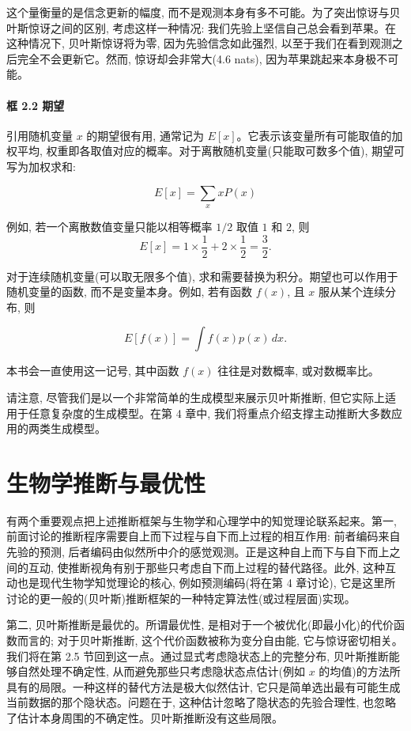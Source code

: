 这个量衡量的是信念更新的幅度, 而不是观测本身有多不可能。为了突出惊讶与贝叶斯惊讶之间的区别, 考虑这样一种情况: 我们先验上坚信自己总会看到苹果。在这种情况下, 贝叶斯惊讶将为零, 因为先验信念如此强烈, 以至于我们在看到观测之后完全不会更新它。然而, 惊讶却会非常大(4.6 nats), 因为苹果跳起来本身极不可能。

\paragraph{框 2.2 期望}

引用随机变量 $x$ 的期望很有用, 通常记为 $E[x]$。它表示该变量所有可能取值的加权平均, 权重即各取值对应的概率。对于离散随机变量(只能取可数多个值), 期望可写为加权求和:

\[
E[x] = \sum_x xP(x)
\]

例如, 若一个离散数值变量只能以相等概率 $1/2$ 取值 $1$ 和 $2$, 则
\[
E[x] = 1 \times \frac{1}{2} + 2 \times \frac{1}{2} = \frac{3}{2}.
\]

对于连续随机变量(可以取无限多个值), 求和需要替换为积分。期望也可以作用于随机变量的函数, 而不是变量本身。例如, 若有函数 $f(x)$, 且 $x$ 服从某个连续分布, 则

\[
E[f(x)] = \int f(x)p(x)\,dx.
\]

本书会一直使用这一记号, 其中函数 $f(x)$ 往往是对数概率, 或对数概率比。

请注意, 尽管我们是以一个非常简单的生成模型来展示贝叶斯推断, 但它实际上适用于任意复杂度的生成模型。在第 4 章中, 我们将重点介绍支撑主动推断大多数应用的两类生成模型。

\section{生物学推断与最优性}

有两个重要观点把上述推断框架与生物学和心理学中的知觉理论联系起来。第一, 前面讨论的推断程序需要自上而下过程与自下而上过程的相互作用: 前者编码来自先验的预测, 后者编码由似然所中介的感觉观测。正是这种自上而下与自下而上之间的互动, 使推断视角有别于那些只考虑自下而上过程的替代路径。此外, 这种互动也是现代生物学知觉理论的核心, 例如预测编码(将在第 4 章讨论), 它是这里所讨论的更一般的(贝叶斯)推断框架的一种特定算法性(或过程层面)实现。

第二, 贝叶斯推断是最优的。所谓最优性, 是相对于一个被优化(即最小化)的代价函数而言的; 对于贝叶斯推断, 这个代价函数被称为变分自由能, 它与惊讶密切相关。我们将在第 2.5 节回到这一点。通过显式考虑隐状态上的完整分布, 贝叶斯推断能够自然处理不确定性, 从而避免那些只考虑隐状态点估计(例如 $x$ 的均值)的方法所具有的局限。一种这样的替代方法是极大似然估计, 它只是简单选出最有可能生成当前数据的那个隐状态。问题在于, 这种估计忽略了隐状态的先验合理性, 也忽略了估计本身周围的不确定性。贝叶斯推断没有这些局限。

